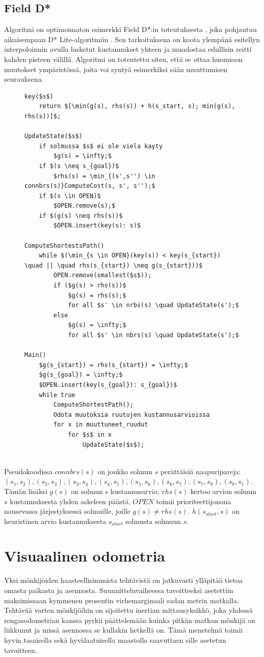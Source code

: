 \documentclass[finnish]{tktltiki2}
\theoremstyle{definition}
\theoremstyle{remark}
\begin{document}
\subsection{Field D*}
Algoritmi on optimoimaton esimerkki Field D*:in toteutuksesta \cite{ferguson2007field}, joka pohjautuu aikaisempaan D* Lite-algoritmiin \cite{koenig2002d}. Sen tarkoituksena on koota ylempänä esitellyn interpoloinnin avulla lasketut kustannukset yhteen ja muodostaa edullisin reitti kahden pisteen välillä. Algoritmi on toteutettu siten, että se ottaa huomioon muutokset ympäristössä, joita voi syntyä esimerkiksi sään muuttumisen seurauksena.

\begin{figure}[H]
\lstset{basicstyle=\footnotesize, tabsize=4}
\begin{lstlisting}[mathescape=true]
key($s$)
	return $[\min(g(s), rhs(s)) + h(s_start, s); min(g(s), rhs(s))]$;

UpdateState($s$)
	if solmussa $s$ ei ole viela kayty
		$g(s) = \infty;$
	if $(s \neq s_{goal})$
		$rhs(s) = \min_{(s',s'') \in connbrs(s)}ComputeCost(s, s', s'');$
	if $(s \in OPEN)$
		$OPEN.remove(s);$
	if $(g(s) \neq rhs(s))$
		$OPEN.insert(key(s): s)$

ComputeShortestsPath()
	while $(\min_{s \in OPEN}(key(s)) < key(s_{start}) \quad || \quad rhs(s_{start}) \neq g(s_{start}))$
		OPEN.remove(smallest($s$));
		if ($g(s) > rhs(s))$
			$g(s) = rhs(s);$
			for all $s' \in nrbs(s) \quad UpdateState(s');$
		else
			$g(s) = \infty;$
			for all $s' \in nbrs(s) \quad UpdateState(s');$

Main()
	$g(s_{start}) = rhs(s_{start}) = \infty;$
	$g(s_{goal}) = \infty;$
	$OPEN.insert(key(s_{goal}): s_{goal})$
	while true
		ComputeShortestPath();
		Odota muutoksia ruutujen kustannusarvioissa
		for x in muuttuneet_ruudut
			for $s$ in x
				UpdateState($s$);


\end{lstlisting}
\end{figure}

Pseudokoodissa $connbrs(s)$ on joukko solmun $s$ perättäisiä naapuripareja: ${(s_1,s_2), (s_2,s_3), (s_3,s_4),(s_4,s_5),(s_5,s_6),(s_6,s_7),(s_7,s_8),(s_8,s_1)}$. Tämän lisäksi $g(s)$ on solmun s kustannusarvio, $rhs(s)$ kertoo arvion solmun $s$ kustannuksesta yhden askeleen päästä, $OPEN$ toimii prioriteettijonona nousevassa järjestyksessä solmuille, joille $g(s) \neq rhs(s)$. $h(s_{start}, s)$ on heuristinen arvio kustannuksesta $s_{start}$ solmusta solmuun $s$.

\section{Visuaalinen odometria}
Yksi mönkijöiden haasteellisimmista tehtävistä on jatkuvasti ylläpitää tietoa omasta paikasta ja asennosta. Suunnitteluvaiheessa tavoitteeksi asetettiin maksimissaan kymmenen prosentin virhemarginaali sadan metrin matkalla. Tehtävää varten mönkijöihin on sijoitettu inertian mittausyksikkö, joka yhdessä rengasodometrian kanssa pyrkii päättelemään kuinka pitkän matkan mönkijä on liikkunut ja missä asennossa se kullakin hetkellä on. Tämä menetelmä toimii hyvin tasaisella sekä hyvälaatuisella maastolla saavuttaen sille asetetun tavoitteen.
\end{document}
